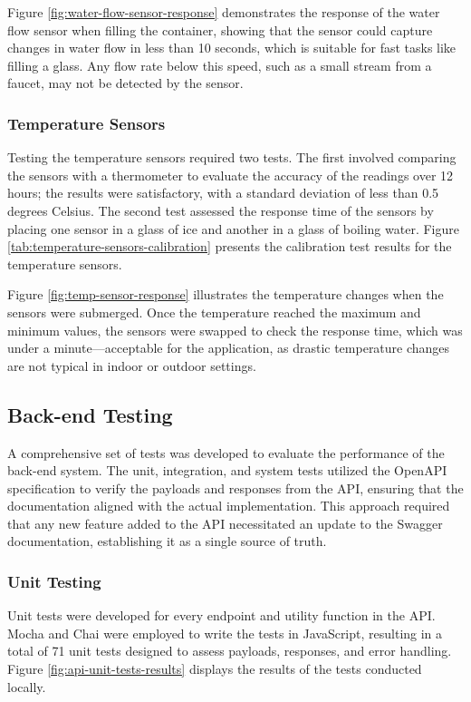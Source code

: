 Figure \ref{fig:water-flow-sensor-response} demonstrates the response of the water flow sensor when filling the 
container, showing that the sensor could capture changes in water flow in less than 10 seconds, which is suitable for 
fast tasks like filling a glass. Any flow rate below this speed, such as a small stream from a faucet, may not be 
detected by the sensor.

\subsubsection{Temperature Sensors}

Testing the temperature sensors required two tests. The first involved comparing the sensors with a thermometer to 
evaluate the accuracy of the readings over 12 hours; the results were satisfactory, with a standard deviation of less 
than 0.5 degrees Celsius. The second test assessed the response time of the sensors by placing one sensor in a glass of 
ice and another in a glass of boiling water. Figure \ref{tab:temperature-sensors-calibration} presents the calibration 
test results for the temperature sensors.

Figure \ref{fig:temp-sensor-response} illustrates the temperature changes when the sensors were submerged. Once the 
temperature reached the maximum and minimum values, the sensors were swapped to check the response time, which was under 
a minute—acceptable for the application, as drastic temperature changes are not typical in indoor or outdoor settings.

\subsection{Back-end Testing}

A comprehensive set of tests was developed to evaluate the performance of the back-end system. The unit, integration, 
and system tests utilized the OpenAPI specification to verify the payloads and responses from the API, ensuring that the 
documentation aligned with the actual implementation. This approach required that any new feature added to the API 
necessitated an update to the Swagger documentation, establishing it as a single source of truth.

\subsubsection{Unit Testing}

Unit tests were developed for every endpoint and utility function in the API. Mocha and Chai were employed to write the 
tests in JavaScript, resulting in a total of 71 unit tests designed to assess payloads, responses, and error handling. 
Figure \ref{fig:api-unit-tests-results} displays the results of the tests conducted locally.

